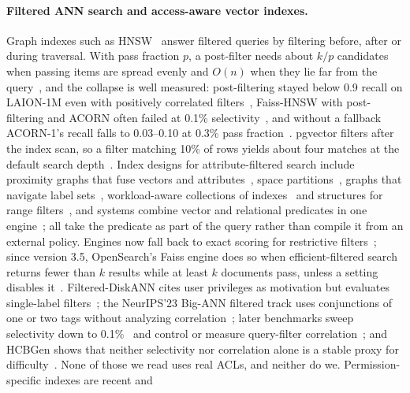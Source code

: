 \paragraph{Filtered ANN search and access-aware vector indexes.}
Graph indexes such as HNSW~\cite{malkov2020efficient} answer filtered queries by filtering before,
after or during traversal. With pass fraction $p$, a post-filter needs about $k/p$ candidates when passing items
are spread evenly and $O(n)$ when they lie far from the query~\cite{patel2024acorn}, and the collapse
is well measured: post-filtering stayed below 0.9 recall on LAION-1M even with positively correlated
filters~\cite{patel2024acorn}, Faiss-HNSW with post-filtering and ACORN often failed at 0.1\%
selectivity~\cite{li2025attribute}, and without a fallback ACORN-1's recall falls to 0.03--0.10 at
0.3\% pass fraction~\cite{kim2026racorn1}. pgvector filters after the index scan, so a filter matching
10\% of rows yields about four matches at the default search depth~\cite{pgvector2026pgvector}.
Index designs for attribute-filtered search include proximity graphs that fuse vectors and
attributes~\cite{wang2023efficient,wu2022hqann}, space partitions~\cite{gupta2023caps}, graphs that
navigate label sets~\cite{cai2024navigating}, workload-aware collections of
indexes~\cite{li2025sieve} and structures for range filters~\cite{zuo2024serf,xu2024irangegraph,engels2024approximate},
and systems combine vector and relational predicates in one engine~\cite{wei2020analyticdbv,zhang2023vbase};
all take the predicate as part of the query rather than compile it from an external policy.
Engines now fall back to exact scoring for restrictive
filters~\cite{aquino2024filtering,rodriguez2024how,trent2025filtered}; since version 3.5, OpenSearch's Faiss engine
does so when efficient-filtered search returns fewer than $k$ results while at least $k$ documents
pass, unless a setting disables it~\cite{opensearch2026efficient}. Filtered-DiskANN cites user privileges as motivation but
evaluates single-label filters~\cite{gollapudi2023filtereddiskann}; the NeurIPS'23 Big-ANN filtered
track uses conjunctions of one or two tags without analyzing correlation~\cite{simhadri2025results};
later benchmarks sweep selectivity down to 0.1\%~\cite{li2025attribute,iff2026benchmarking,shi2025filtered}
and control or measure query-filter correlation~\cite{zhang2026vecbench,amanbayev2026filtered,lu2026indepth};
and HCBGen shows that neither selectivity nor correlation alone is a stable proxy for
difficulty~\cite{lim2026revisiting}. None of those we read uses real ACLs, and neither do we. Permission-specific indexes are recent and
